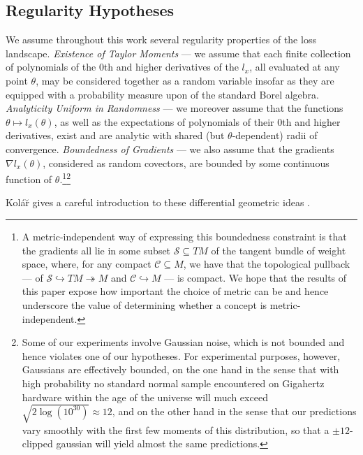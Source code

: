 \documentclass{article}
\theoremstyle{plain}
\theoremstyle{definition}
\newcommand{\Cc}{\mathcal{C}}
\newcommand{\Ss}{\mathcal{S}}
\begin{document}
    \subsection{Regularity Hypotheses}
        We assume throughout this work several regularity properties of the
        loss landscape.  \emph{Existence of Taylor Moments} --- we assume that
        each finite collection of polynomials of the $0$th and higher
        derivatives of the $l_x$, all evaluated at any point $\theta$, may be
        considered together as a random variable insofar
        as they are equipped with a probability measure upon of the standard
        Borel algebra.  \emph{Analyticity Uniform in Randomness} --- we
        moreover assume that the functions $\theta \mapsto l_x(\theta)$, as
        well as the expectations of polynomials of their $0$th and higher
        derivatives, exist and are analytic with shared (but
        $\theta$-dependent) radii of convergence.  \emph{Boundedness of
        Gradients} --- we also assume that the gradients $\nabla l_x(\theta)$,
        considered as random covectors, are bounded by some continuous function
        of $\theta$.\footnote{
            A metric-independent way of expressing this boundedness constraint
            is that the gradients all lie in some subset $\Ss \subseteq TM$ of
            the tangent bundle of weight space, where, for any compact $\Cc
            \subseteq M$, we have that the topological pullback --- of
            $\Ss \hookrightarrow TM \twoheadrightarrow M$
            and
            $\Cc \hookrightarrow M$ ---
            is compact.  We hope that the results of this paper expose how
            important the choice of metric can be and hence underscore the
            value of determining  whether a concept is metric-independent.
        }\footnote{
            Some of our experiments involve Gaussian noise, which is not
            bounded and hence violates one of our hypotheses.  For experimental
            purposes, however, Gaussians are effectively bounded, on the one
            hand in the sense that with high probability no standard normal
            sample encountered on Gigahertz hardware within the age of the
            universe will much exceed $\sqrt{2 \log(10^{30})} \approx 12$, and
            on the other hand in the sense that our predictions vary smoothly
            with the first few moments of this distribution, so that a $\pm
            12$-clipped gaussian will yield almost the same predictions.
        }

        Kol\'{a}\u{r} gives a careful introduction to these differential
        geometric ideas .
\end{document}
